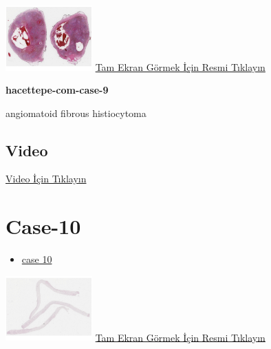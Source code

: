 \documentclass[
  letterpaper,
  DIV=11,
  numbers=noendperiod]{scrreprt}
\providecommand{\tightlist}{%
  \setlength{\itemsep}{0pt}\setlength{\parskip}{0pt}}\usepackage{longtable,booktabs,array}
\begin{document}
\href{https://images.patolojiatlasi.com/hacettepe-com-case-9/HE.html}{\includegraphics[width=0.25\textwidth,height=\textheight]{./screenshots/thumbnail_hacettepe-com-case-9.png}}
\href{https://images.patolojiatlasi.com/hacettepe-com-case-9/HE.html}{Tam
Ekran Görmek İçin Resmi Tıklayın}

\textbf{hacettepe-com-case-9}

\begin{tcolorbox}[enhanced jigsaw, colbacktitle=quarto-callout-tip-color!10!white, colback=white, titlerule=0mm, opacityback=0, colframe=quarto-callout-tip-color-frame, opacitybacktitle=0.6, bottomrule=.15mm, breakable, coltitle=black, title=\textcolor{quarto-callout-tip-color}{\faLightbulb}\hspace{0.5em}{Tanı}, toprule=.15mm, toptitle=1mm, bottomtitle=1mm, arc=.35mm, rightrule=.15mm, leftrule=.75mm, left=2mm]

angiomatoid fibrous histiocytoma

\end{tcolorbox}

\hypertarget{video-7}{%
\subsection{Video}\label{video-7}}

\href{https://www.youtube.com/watch?v=9OxpsDNCHWk}{Video İçin Tıklayın}

\hypertarget{sec-hacettepe-case-of-the-month-case-10}{%
\section{Case-10}\label{sec-hacettepe-case-of-the-month-case-10}}

\begin{itemize}
\tightlist
\item
  \href{https://www.youtube.com/watch?v=0vNcCaTYstU\&ab_channel=KemalKosemehmetoglu}{case
  10}
\end{itemize}

\href{https://images.patolojiatlasi.com/hacettepe-com-case-10/HE.html}{\includegraphics[width=0.25\textwidth,height=\textheight]{./screenshots/thumbnail_hacettepe-com-case-10.png}}
\href{https://images.patolojiatlasi.com/hacettepe-com-case-10/HE.html}{Tam
Ekran Görmek İçin Resmi Tıklayın}
\end{document}
